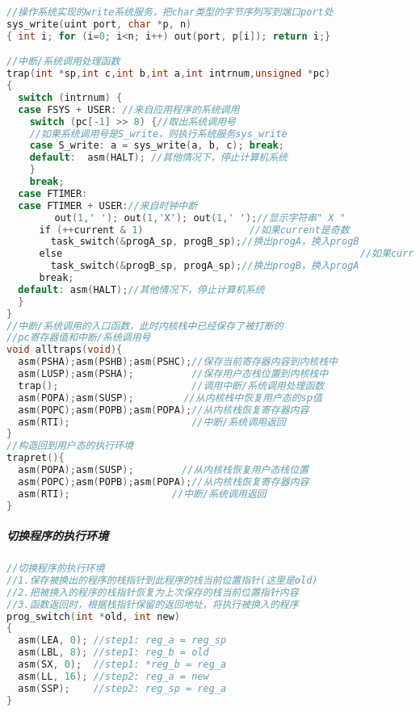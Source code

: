 \begin{lstlisting}[language={C}]
//操作系统实现的write系统服务，把char类型的字节序列写到端口port处
sys_write(uint port, char *p, n) 
{ int i; for (i=0; i<n; i++) out(port, p[i]); return i;}

//中断/系统调用处理函数
trap(int *sp,int c,int b,int a,int intrnum,unsigned *pc)
{
  switch (intrnum) {
  case FSYS + USER: //来自应用程序的系统调用
    switch (pc[-1] >> 8) {//取出系统调用号
    //如果系统调用号是S_write，则执行系统服务sys_write
    case S_write: a = sys_write(a, b, c); break;
    default:  asm(HALT); //其他情况下，停止计算机系统
    }
    break;   
  case FTIMER:  
  case FTIMER + USER://来自时钟中断
　　　　　out(1,' '); out(1,'X'); out(1,' ');//显示字符串" X "
    　if (++current & 1)　　               //如果current是奇数
     　 task_switch(&progA_sp, progB_sp);//换出progA，换入progB
    　else　　　　　　　　　　　　　　　　　　　　　　　　　　　　　　　//如果current是偶数
     　 task_switch(&progB_sp, progA_sp);//换出progB，换入progA
    　break;
  default: asm(HALT);//其他情况下，停止计算机系统
  }
}
//中断/系统调用的入口函数，此时内核栈中已经保存了被打断的
//pc寄存器值和中断/系统调用号
void alltraps(void){
  asm(PSHA);asm(PSHB);asm(PSHC);//保存当前寄存器内容到内核栈中
  asm(LUSP);asm(PSHA);          //保存用户态栈位置到内核栈中
  trap();                       //调用中断/系统调用处理函数
  asm(POPA);asm(SUSP); 　　　　 //从内核栈中恢复用户态的sp值
  asm(POPC);asm(POPB);asm(POPA);//从内核栈恢复寄存器内容
  asm(RTI);                     //中断/系统调用返回
}
//构造回到用户态的执行环境
trapret(){
  asm(POPA);asm(SUSP);　　　　　//从内核栈恢复用户态栈位置
  asm(POPC);asm(POPB);asm(POPA);//从内核栈恢复寄存器内容
  asm(RTI);　　　　　　　　　　 //中断/系统调用返回
}

\end{lstlisting}

\subparagraph{切换程序的执行环境}

\begin{lstlisting}[language={C}]
//切换程序的执行环境
//1.保存被换出的程序的栈指针到此程序的栈当前位置指针(这里是old)
//2.把被换入的程序的栈指针恢复为上次保存的栈当前位置指针内容
//3.函数返回时，根据栈指针保留的返回地址，将执行被换入的程序
prog_switch(int *old, int new) 
{
  asm(LEA, 0); //step1: reg_a = reg_sp　　
  asm(LBL, 8); //step1: reg_b = old
  asm(SX, 0);  //step1: *reg_b = reg_a
  asm(LL, 16); //step2: reg_a = new
  asm(SSP);    //step2: reg_sp = reg_a
}
\end{lstlisting}
 
